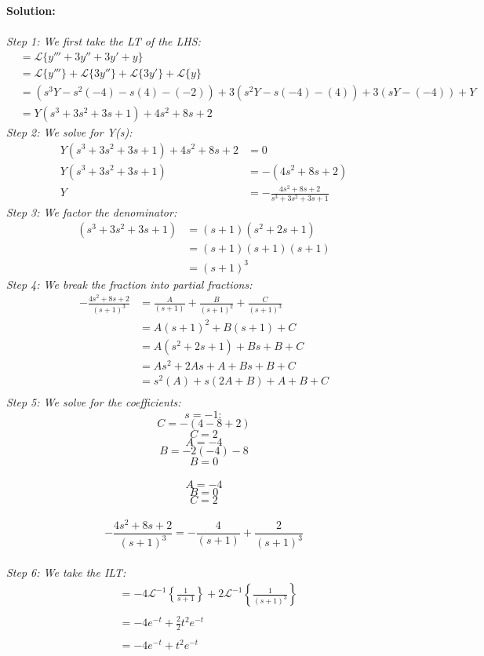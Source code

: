 \documentclass{article}
\begin{document}
    \textbf{Solution:} \\ \\
    \textit{Step 1: We first take the LT of the LHS:} 
    \begin{align*}
        &= \mathcal{L}\{y''' + 3y''+ 3y' + y\} \\
        &= \mathcal{L}\{y'''\} + \mathcal{L}\{3y''\} + \mathcal{L} \{3y'\} + \mathcal{L} \{y\} \\
        &= (s^{3}Y -s^{2}(-4) -s(4) -(-2)) + 3(s^{2}Y -s(-4) - (4)) + 3(sY - (-4)) + Y \\
        &= Y(s^{3} + 3s^{2} + 3s + 1) + 4s^{2} + 8s + 2
    \end{align*}
    \textit{Step 2: We solve for Y(s):} \\
    \begin{align*}
        Y(s^{3}  + 3s^{2} + 3s + 1) + 4s^{2} + 8s + 2 &= 0 \\
        Y(s^{3} + 3s^{2} + 3s + 1) &= -(4s^{2} + 8s + 2) \\
        Y &= -\frac{4s^{2} + 8s + 2}{s^{3}  + 3s^{2} + 3s + 1}
    \end{align*}
    \textit{Step 3: We factor the denominator:}
    \begin{align*}
        (s^{3}  + 3s^{2} + 3s + 1) &= (s + 1)(s^{2} + 2s + 1) \\
        &= (s + 1)(s + 1)(s + 1) \\
        &= (s + 1)^{3}
    \end{align*}
    \textit{Step 4: We break the fraction into partial fractions:}
    \begin{align*}
        -\frac{4s^{2} + 8s + 2}{(s + 1)^{3}} &= \frac{A}{(s + 1)} + \frac{B}{(s + 1)^{2}} + \frac{C}{(s + 1)^{3}} \\
        &= A(s + 1)^{2} + B(s + 1) + C \\
        &= A(s^{2} + 2s + 1) + Bs + B + C \\
        &= As^{2} + 2As + A + Bs + B + C \\
        &= s^{2}(A) + s(2A + B) + A + B + C \\ 
    \end{align*}
    \textit{Step 5: We solve for the coefficients:}
    $$s = -1:$$
    $$C = -(4 - 8 + 2)$$
    $$C = 2$$
    $$A = -4$$
    $$B = -2(-4) - 8$$
    $$B = 0$$
     \\
    $$A = -4$$ 
    $$B = 0$$ 
    $$C = 2$$ \\ 
    $$-\frac{4s^{2} + 8s + 2}{(s + 1)^{3}}= -\frac{4}{(s + 1)} + \frac{2}{(s + 1)^{3}}$$ \\
    \textit{Step 6: We take the ILT:}
    \begin{align*}
        &= -4\mathcal{L}^{-1}\left\{\frac{1}{s + 1}\right\} + 2\mathcal{L}^{-1} \left\{\frac{1}{(s + 1)^{3}}\right\} \\ \\
        &= -4e^{-t} + \frac{2}{2}t^{2}e^{-t} \\ \\
        &= -4e^{-t} + t^{2}e^{-t}
    \end{align*}
\end{document}
